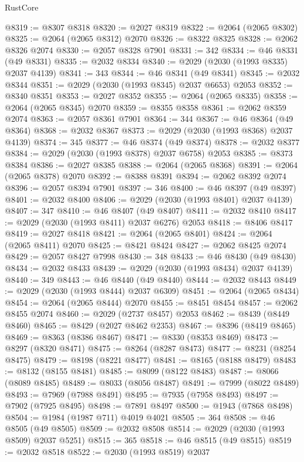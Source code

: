 \begin{lexlean}{RustCore}
\begin{coremodule}
@8319 := @8307 @8318
@8320 := @2027 @8319
@8322 := @2064 (@2065 @8302)
@8325 := @2064 (@2065 @8312) @2070
@8326 := @8322 @8325
@8328 := @2062 @8326 @2074
@8330 := @2057 @8328 @7901
@8331 := 342
@8334 := @46 @8331 (@49 @8331)
@8335 := @2032 @8334
@8340 := @2029 (@2030 (@1993 @8335) @2037 @4139)
@8341 := 343
@8344 := @46 @8341 (@49 @8341)
@8345 := @2032 @8344
@8351 := @2029 (@2030 (@1993 @8345) @2037 @6653) @2053
@8352 := @8340 @8351
@8353 := @2027 @8352
@8355 := @2064 (@2065 @8335)
@8358 := @2064 (@2065 @8345) @2070
@8359 := @8355 @8358
@8361 := @2062 @8359 @2074
@8363 := @2057 @8361 @7901
@8364 := 344
@8367 := @46 @8364 (@49 @8364)
@8368 := @2032 @8367
@8373 := @2029 (@2030 (@1993 @8368) @2037 @4139)
@8374 := 345
@8377 := @46 @8374 (@49 @8374)
@8378 := @2032 @8377
@8384 := @2029 (@2030 (@1993 @8378) @2037 @6758) @2053
@8385 := @8373 @8384
@8386 := @2027 @8385
@8388 := @2064 (@2065 @8368)
@8391 := @2064 (@2065 @8378) @2070
@8392 := @8388 @8391
@8394 := @2062 @8392 @2074
@8396 := @2057 @8394 @7901
@8397 := 346
@8400 := @46 @8397 (@49 @8397)
@8401 := @2032 @8400
@8406 := @2029 (@2030 (@1993 @8401) @2037 @4139)
@8407 := 347
@8410 := @46 @8407 (@49 @8407)
@8411 := @2032 @8410
@8417 := @2029 (@2030 (@1993 @8411) @2037 @6276) @2053
@8418 := @8406 @8417
@8419 := @2027 @8418
@8421 := @2064 (@2065 @8401)
@8424 := @2064 (@2065 @8411) @2070
@8425 := @8421 @8424
@8427 := @2062 @8425 @2074
@8429 := @2057 @8427 @7998
@8430 := 348
@8433 := @46 @8430 (@49 @8430)
@8434 := @2032 @8433
@8439 := @2029 (@2030 (@1993 @8434) @2037 @4139)
@8440 := 349
@8443 := @46 @8440 (@49 @8440)
@8444 := @2032 @8443
@8449 := @2029 (@2030 (@1993 @8444) @2037 @6309)
@8451 := @2064 (@2065 @8434)
@8454 := @2064 (@2065 @8444) @2070
@8455 := @8451 @8454
@8457 := @2062 @8455 @2074
@8460 := @2029 (@2737 @8457) @2053
@8462 := @8439 (@8449 @8460)
@8465 := @8429 (@2027 @8462 @2353)
@8467 := @8396 (@8419 @8465)
@8469 := @8363 (@8386 @8467)
@8471 := @8330 (@8353 @8469)
@8473 := @8297 (@8320 @8471)
@8475 := @8264 (@8287 @8473)
@8477 := @8231 (@8254 @8475)
@8479 := @8198 (@8221 @8477)
@8481 := @8165 (@8188 @8479)
@8483 := @8132 (@8155 @8481)
@8485 := @8099 (@8122 @8483)
@8487 := @8066 (@8089 @8485)
@8489 := @8033 (@8056 @8487)
@8491 := @7999 (@8022 @8489)
@8493 := @7969 (@7988 @8491)
@8495 := @7935 (@7958 @8493)
@8497 := @7902 (@7925 @8495)
@8498 := @7891 @8497
@8500 := @1943 (@7868 @8498)
@8504 := @1984 (@1987 @711) @4019 @4021
@8505 := 364
@8508 := @46 @8505 (@49 @8505)
@8509 := @2032 @8508
@8514 := @2029 (@2030 (@1993 @8509) @2037 @5251)
@8515 := 365
@8518 := @46 @8515 (@49 @8515)
@8519 := @2032 @8518
@8522 := @2030 (@1993 @8519) @2037

\end{coremodule}
\end{lexlean}
